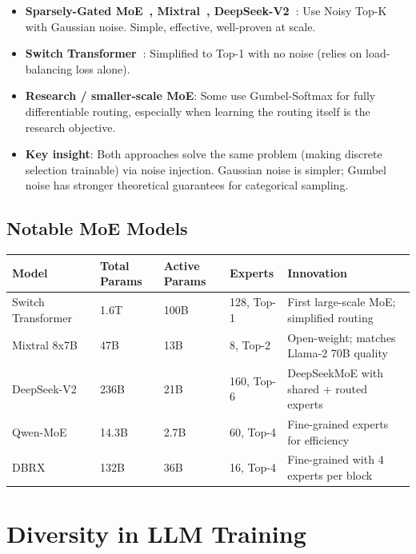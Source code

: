 \begin{keybox}
\begin{itemize}
  \item \textbf{Sparsely-Gated MoE~\cite{shazeer2017outrageously}, Mixtral~\cite{jiang2024mixtral}, DeepSeek-V2~\cite{deepseekv2}}: Use Noisy Top-K with Gaussian noise. Simple, effective, well-proven at scale.
  \item \textbf{Switch Transformer~\cite{fedus2022switch}}: Simplified to Top-1 with no noise (relies on load-balancing loss alone).
  \item \textbf{Research / smaller-scale MoE}: Some use Gumbel-Softmax for fully differentiable routing, especially when learning the routing itself is the research objective.
  \item \textbf{Key insight}: Both approaches solve the same problem (making discrete selection trainable) via noise injection. Gaussian noise is simpler; Gumbel noise has stronger theoretical guarantees for categorical sampling.
\end{itemize}
\end{keybox}

\subsection{Notable MoE Models}
\label{notable-moe-models}

\begin{tabular}{@{}lp{2.5cm}p{2.8cm}p{2.8cm}p{2.8cm}@{}}
\toprule
\textbf{Model} & \textbf{Total Params} & \textbf{Active Params} & \textbf{Experts} & \textbf{Innovation} \\
\midrule
Switch Transformer~\cite{fedus2022switch} & 1.6T & 100B & 128, Top-1 & First large-scale MoE; simplified routing \\
Mixtral 8x7B~\cite{jiang2024mixtral} & 47B & 13B & 8, Top-2 & Open-weight; matches Llama-2 70B quality \\
DeepSeek-V2~\cite{deepseekv2} & 236B & 21B & 160, Top-6 & DeepSeekMoE with shared + routed experts \\
Qwen-MoE~\cite{qwen2024qwen25} & 14.3B & 2.7B & 60, Top-4 & Fine-grained experts for efficiency \\
DBRX~\cite{databricks2024dbrx} & 132B & 36B & 16, Top-4 & Fine-grained with 4 experts per block \\
\bottomrule
\end{tabular}

\section{Diversity in LLM Training}
\label{diversity-in-llm-training}

